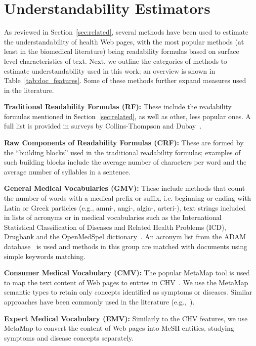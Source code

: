 
\section{ Understandability Estimators}
\label{sec:proxies}

As reviewed in Section~\ref{sec:related}, several methods have been used to estimate the understandability of health Web pages, with the most popular methods (at least in the biomedical literature) being readability formulas based on surface level characteristics of text. Next, we outline the categories of methods to estimate understandability used in this work; an overview is shown in Table~\ref{tab:doc_features}. Some of these methods further expand measures used in the literature. 
 
\textbf{Traditional Readability Formulas (RF):}
These include the readability formulas mentioned in Section~\ref{sec:related}, as well as other, less popular ones. A full list is provided in surveys by Collins-Thompson \cite{collins2014computational} and Dubay~\cite{dubay04}.

\textbf{Raw Components of Readability Formulas (CRF):}
These are formed by the ``building blocks'' used in the traditional readability formulas; examples of such building blocks include the average number of characters per word and the average number of syllables in a sentence. %

\textbf{General Medical Vocabularies (GMV):}
These include methods that count the number of words with a medical prefix or suffix, i.e. beginning or ending with Latin or Greek particles (e.g., amni-, angi-, algia-, arteri-), text strings included in lists of acronyms or in medical vocabularies such as the International Statistical Classification of Diseases and Related Health Problems (ICD), Drugbank and the OpenMedSpel dictionary~\cite{openmedspel}. An acronym list from the ADAM database~\cite{zhou2006} is used and methods in this group are matched with documents using simple keywords matching.

\textbf{Consumer Medical Vocabulary (CMV):}
The popular MetaMap \cite{aronson10} tool is used to map the text content of Web pages to entries in  CHV~\cite{zeng06}.
We use the MetaMap semantic types to retain only concepts identified as symptoms or diseases. Similar approaches have been commonly used in the literature (e.g.,~\cite{pang16,agrafiotesA16,palotti16,yates13}).

\textbf{Expert Medical Vocabulary (EMV):}
Similarly to the CHV features, we use MetaMap to convert the content of Web pages into MeSH entities, studying symptoms and disease concepts separately. 

